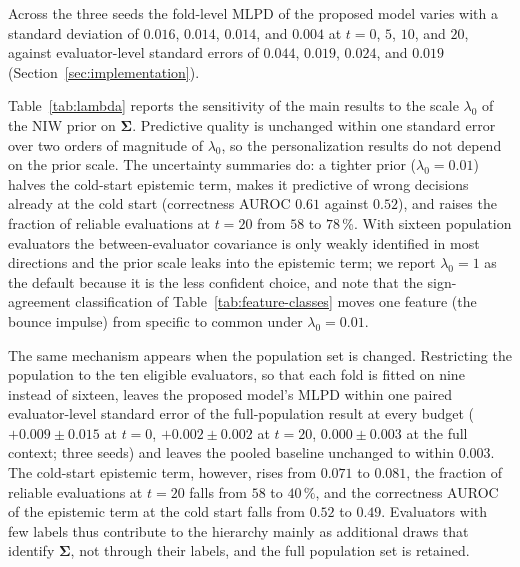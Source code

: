 \documentclass[lettersize,journal]{IEEEtran}
\newif\ifdraftnotes
\newcommand{\draftnote}[1]{\ifdraftnotes\textcolor{red}{\textbf{[TODO: #1]}}\fi}
\begin{document}
\draftnote{Trace plots of the population log-likelihood and the number of included groups for the retained sweeps; rank-normalized $\widehat R$ and effective sample sizes across the three seeds.} Across the three seeds the fold-level MLPD of the proposed model varies with a standard deviation of $0.016$, $0.014$, $0.014$, and $0.004$ at $t=0$, $5$, $10$, and $20$, against evaluator-level standard errors of $0.044$, $0.019$, $0.024$, and $0.019$ (Section~\ref{sec:implementation}).

Table~\ref{tab:lambda} reports the sensitivity of the main results to the scale $\lambda_0$ of the NIW prior on $\bm\Sigma$. Predictive quality is unchanged within one standard error over two orders of magnitude of $\lambda_0$, so the personalization results do not depend on the prior scale. The uncertainty summaries do: a tighter prior ($\lambda_0=0.01$) halves the cold-start epistemic term, makes it predictive of wrong decisions already at the cold start (correctness AUROC $0.61$ against $0.52$), and raises the fraction of reliable evaluations at $t=20$ from $58$ to $78$\,\%. With sixteen population evaluators the between-evaluator covariance is only weakly identified in most directions and the prior scale leaks into the epistemic term; we report $\lambda_0=1$ as the default because it is the less confident choice, and note that the sign-agreement classification of Table~\ref{tab:feature-classes} moves one feature (the bounce impulse) from specific to common under $\lambda_0=0.01$.

The same mechanism appears when the population set is changed. Restricting the population to the ten eligible evaluators, so that each fold is fitted on nine instead of sixteen, leaves the proposed model's MLPD within one paired evaluator-level standard error of the full-population result at every budget ($+0.009\pm0.015$ at $t=0$, $+0.002\pm0.002$ at $t=20$, $0.000\pm0.003$ at the full context; three seeds) and leaves the pooled baseline unchanged to within $0.003$. The cold-start epistemic term, however, rises from $0.071$ to $0.081$, the fraction of reliable evaluations at $t=20$ falls from $58$ to $40\,\%$, and the correctness AUROC of the epistemic term at the cold start falls from $0.52$ to $0.49$. Evaluators with few labels thus contribute to the hierarchy mainly as additional draws that identify $\bm\Sigma$, not through their labels, and the full population set is retained.
\end{document}
